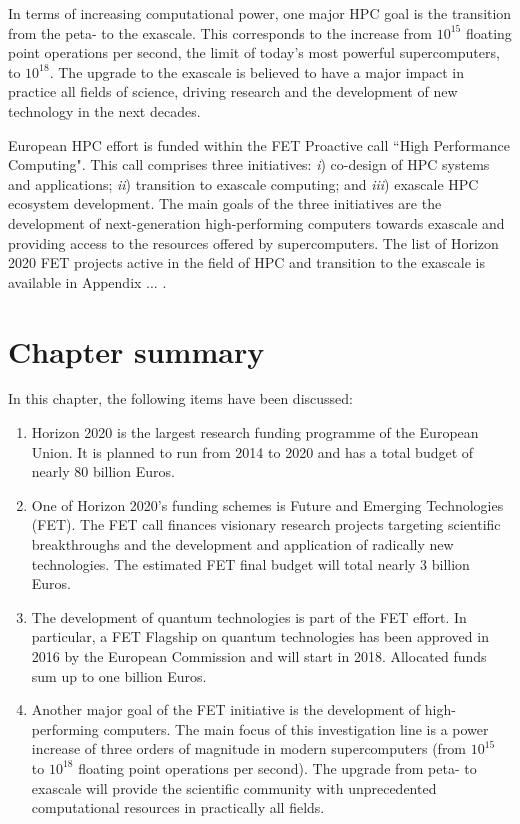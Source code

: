 In terms of increasing computational power, one major HPC goal is the transition from the peta- to the exascale. This corresponds to the increase from $10^{15}$ floating point operations per second, the limit of today's most powerful supercomputers, to $10^{18}$. The upgrade to the exascale is believed to have a major impact in practice all fields of science, driving research and the development of new technology in the next decades. 

European HPC effort is funded within the FET Proactive call ``High Performance Computing". This call comprises three initiatives: \textit{i}) co-design of HPC systems and applications; \textit{ii}) transition to exascale computing; and \textit{iii}) exascale HPC ecosystem development. The main goals of the three initiatives are the development of next-generation high-performing computers towards exascale and providing access to the resources offered by supercomputers. The list of Horizon 2020 FET projects active in the field of HPC and transition to the exascale is available in Appendix ... .

\section{Chapter summary} 
In this chapter, the following items have been discussed:

\begin{enumerate}
 \item Horizon 2020 is the largest research funding programme of the European Union. It is planned to run from 2014 to 2020 and has a total budget of nearly 80 billion Euros. 
 \item One of Horizon 2020's funding schemes is Future and Emerging Technologies (FET). The FET call finances visionary research projects targeting scientific breakthroughs and the development and application of radically new technologies. The estimated FET final budget will total nearly 3 billion Euros. 
 \item The development of quantum technologies is part of the FET effort. In particular, a FET Flagship on quantum technologies has been approved in 2016 by the European Commission and will start in 2018. Allocated funds sum up to one billion Euros. 
 \item Another major goal of the FET initiative is the development of high-performing computers. The main focus of this investigation line is a power increase of three orders of magnitude in modern supercomputers (from $10^{15}$ to $10^{18}$ floating point operations per second). The upgrade from peta- to exascale will provide the scientific community with unprecedented computational resources in practically all fields.    
\end{enumerate}